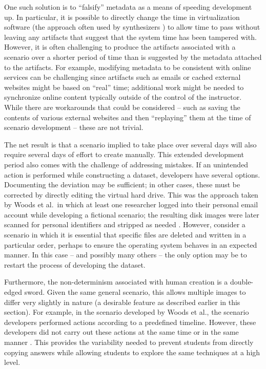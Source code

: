 \documentclass[letterpaper,12pt]{report}
\begin{document}
One such solution is to ``falsify'' metadata as a means of speeding
development up. In particular, it is possible to directly change the
time in virtualization software (the approach often used by synthesizers
\cite{gobelForTraceHolisticForensic2022,mochForensicImageGenerator2009})
to allow time to pass without leaving any artifacts that suggest that
the system time has been tampered with. However, it is often challenging
to produce the artifacts associated with a scenario over a shorter
period of time than is suggested by the metadata attached to the
artifacts. For example, modifying metadata to be consistent with online
services can be challenging since artifacts such as emails or cached
external websites might be based on ``real'' time; additional work might
be needed to synchronize online content typically outside of the control
of the instructor. While there are workarounds that could be considered
-- such as saving the contents of various external websites and then
``replaying'' them at the time of scenario development -- these are not
trivial.

The net result is that a scenario implied to take place over several
days will also require several days of effort to create manually. This
extended development period also comes with the challenge of addressing
mistakes. If an unintended action is performed while constructing a
dataset, developers have several options. Documenting the deviation may
be sufficient; in other cases, these must be corrected by directly
editing the virtual hard drive. This was the approach taken by Woods et
al.~in which at least one researcher logged into their personal email
account while developing a fictional scenario; the resulting disk images
were later scanned for personal identifiers and stripped as needed
\cite{woodsCreatingRealisticCorpora2011}. However, consider a
scenario in which it is essential that specific files are deleted and
written in a particular order, perhaps to ensure the operating system
behaves in an expected manner. In this case -- and possibly many others
-- the only option may be to restart the process of developing the
dataset.

Furthermore, the non-determinism associated with human creation is a
double-edged sword. Given the same general scenario, this allows
multiple images to differ very slightly in nature (a desirable feature
as described earlier in this section). For example, in the scenario
developed by Woods et al., the scenario developers performed actions
according to a predefined timeline. However, these developers did not
carry out these actions at the same time or in the same manner
\cite{woodsCreatingRealisticCorpora2011}. This provides the
variability needed to prevent students from directly copying answers
while allowing students to explore the same techniques at a high level.
\end{document}
